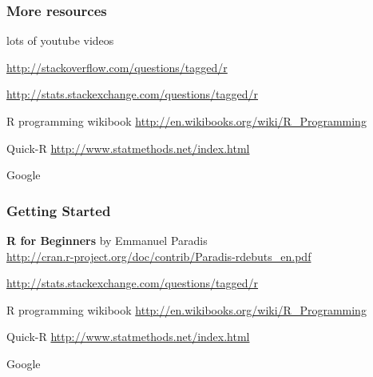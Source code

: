 \documentclass[12pt]{beamer}\usepackage[]{graphicx}\usepackage[]{color}
\begin{document}
\begin{frame}
\frametitle{More resources}

\bi
  \item lots of youtube videos
  \item {\small \url{http://stackoverflow.com/questions/tagged/r}}
  \item {\small \url{http://stats.stackexchange.com/questions/tagged/r}}
  \item R programming wikibook {\small \url{http://en.wikibooks.org/wiki/R_Programming}}
  \item Quick-R  {\small\url{http://www.statmethods.net/index.html}}
  \item Google
\ei

\end{frame}


\begin{frame}
\frametitle{Getting Started}

\bi
  \item \textbf{R for Beginners} by Emmanuel Paradis \\
  \url{http://cran.r-project.org/doc/contrib/Paradis-rdebuts_en.pdf}
  \item {\small \url{http://stats.stackexchange.com/questions/tagged/r}}
  \item R programming wikibook {\small \url{http://en.wikibooks.org/wiki/R_Programming}}
  \item Quick-R  {\small\url{http://www.statmethods.net/index.html}}
  \item Google
\ei

\end{frame}

\end{document}

